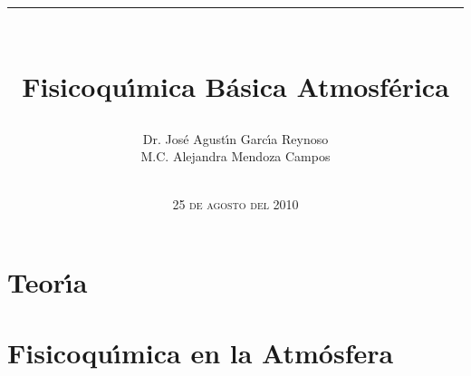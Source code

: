 \documentclass[10pt,spanish]{book}
\newcommand{\HRule}{\rule{\linewidth}{1mm}}
\begin{document}
\setlength{\unitlength}{1mm}
%

\pagestyle{fancy}
\addtolength{\headwidth}{.8\marginparwidth}
\renewcommand{\chaptermark}[1]{\markboth{#1}{}}
\renewcommand{\sectionmark}[1]{\markright{\thesection\ #1}}
\fancyhf{} 
\fancyhead[LE,RO]{\bfseries\thepage}
\fancyhead[LO]{\bfseries\rightmark}
\fancyhead[RE]{\bfseries\leftmark}
\renewcommand{\headrulewidth}{0.5pt}
\renewcommand{\footrulewidth}{0pt}
\addtolength{\headheight}{2.0pt}
\fancypagestyle{plain}{
    \fancyhead{}
    \renewcommand{\headrulewidth}{0pt}
}

{\pagestyle{empty}

\frontmatter
\title{\HRule\\[5mm]\Huge Fisicoqu\'{\i}mica B\'asica Atmosf\'erica }
\author{Dr. Jos\'e Agust\'{\i}n Garc\'{\i}a Reynoso \\
M.C. Alejandra Mendoza Campos\\[1mm] \HRule}
\date{\textsc{ 25 de agosto del 2010}}
\maketitle

\pagestyle{fancy}
\setcounter{page}{1}
\tableofcontents
\listoftables
\listoffigures
   }
{\mainmatter

\pagestyle{fancy}

\part{Teor\'{\i}a}



%
\part{Fisicoqu\'{\i}mica en la Atm\'osfera}


}
{\backmatter

\pagestyle{fancy}





\printindex

}

 
\end{document}
